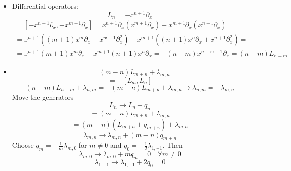 \documentclass[12pt]{article}
\theoremstyle{definition}
\begin{document}
\begin{enumerate}
    \begin{itemize}
        \item Differential operators:
        \begin{equation}
            L_n=-x^{n+1}\partial_x
        \end{equation}
        \begin{multline}
            [L_n,L_m]=[-x^{n+1}\partial_x,-x^{m+1}\partial_x]=x^{n+1}\partial_x( x^{m+1}\partial_x)-x^{m+1}\partial_x(x^{n+1}\partial_x)=\\=x^{n+1}((m+1)x^m \partial_x +x^{m+1}\partial^2_x)-x^{m+1}((n+1)x^{n}\partial_x+x^{n+1}\partial^2_x)=\\=x^{n+1}(m+1)x^m \partial_x - x^{m+1}(n+1)x^{n}\partial_x=-(n- m)x^{n+m+1}\partial_x=(n-m)L_{n+m}
        \end{multline}
        \item
        \begin{equation}
            [L_m,L_n]=(m-n)L_{m+n}+\lambda_{m,n}
        \end{equation}
        \begin{equation}
            [L_n,L_m]=-[L_m,L_n]
        \end{equation}
    \begin{equation}
        (n-m)L_{n+m}+\lambda_{n,m}=-(m-n)L_{m+n}+\lambda_{m,n}\rightarrow\lambda_{n,m}=-\lambda_{m,n}
    \end{equation}
    Move the generators
    \begin{equation}
        L_n\rightarrow L_n+q_n
    \end{equation}
    \begin{equation}
        [L_m,L_n]=(m-n)L_{m+n}+\lambda_{m,n}
    \end{equation}
    \begin{equation}
        [L_m+q_m,L_n+q_n]=(m-n)(L_{m+n}+q_{m+n})+\lambda_{m,n}
    \end{equation}
    \begin{equation}
        \lambda_{m,n}\rightarrow\lambda_{m,n}+(m-n)q_{m+n}
    \end{equation}
    Choose $q_m=-\frac{1}{m}\lambda_{m,0}$ for $m\neq0$ and $q_0=-\frac{1}{2}\lambda_{1,-1}$. Then
    \begin{equation}
        \lambda_{m,0}\rightarrow\lambda_{m,0}+mq_m=0\quad\forall m\neq0
    \end{equation}
    \begin{equation}
        \lambda_{1,-1}\rightarrow\lambda_{1,-1}+2q_0=0
    \end{equation}

\end{itemize}
\end{enumerate}
\end{document}
